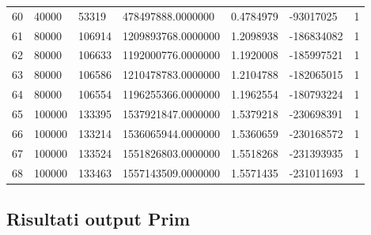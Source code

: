 \begin{longtable}{lllllll}
    60               & 40000          & 53319          & 478497888.0000000  & 0.4784979        & -93017025       & 1                    \\
    61               & 80000          & 106914         & 1209893768.0000000 & 1.2098938        & -186834082      & 1                    \\
    62               & 80000          & 106633         & 1192000776.0000000 & 1.1920008        & -185997521      & 1                    \\
    63               & 80000          & 106586         & 1210478783.0000000 & 1.2104788        & -182065015      & 1                    \\
    64               & 80000          & 106554         & 1196255366.0000000 & 1.1962554        & -180793224      & 1                    \\
    65               & 100000         & 133395         & 1537921847.0000000 & 1.5379218        & -230698391      & 1                    \\
    66               & 100000         & 133214         & 1536065944.0000000 & 1.5360659        & -230168572      & 1                    \\
    67               & 100000         & 133524         & 1551826803.0000000 & 1.5518268        & -231393935      & 1                    \\
    68               & 100000         & 133463         & 1557143509.0000000 & 1.5571435        & -231011693      & 1                   
    \end{longtable}

\subsection{Risultati output Prim}

